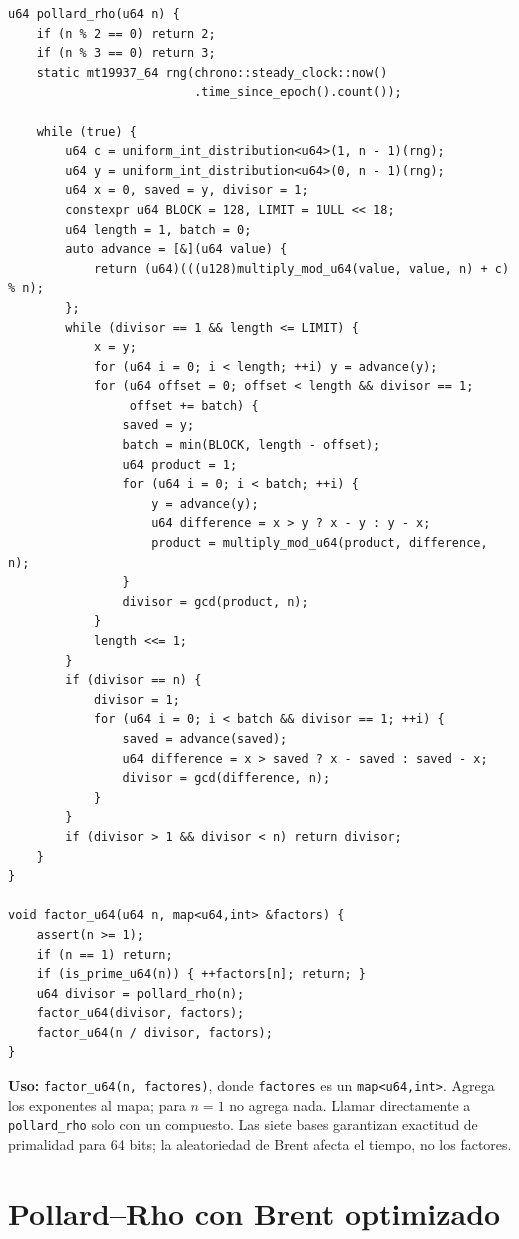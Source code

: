 \begin{lstlisting}[style=cpp]
u64 pollard_rho(u64 n) {
    if (n % 2 == 0) return 2;
    if (n % 3 == 0) return 3;
    static mt19937_64 rng(chrono::steady_clock::now()
                          .time_since_epoch().count());

    while (true) {
        u64 c = uniform_int_distribution<u64>(1, n - 1)(rng);
        u64 y = uniform_int_distribution<u64>(0, n - 1)(rng);
        u64 x = 0, saved = y, divisor = 1;
        constexpr u64 BLOCK = 128, LIMIT = 1ULL << 18;
        u64 length = 1, batch = 0;
        auto advance = [&](u64 value) {
            return (u64)(((u128)multiply_mod_u64(value, value, n) + c) % n);
        };
        while (divisor == 1 && length <= LIMIT) {
            x = y;
            for (u64 i = 0; i < length; ++i) y = advance(y);
            for (u64 offset = 0; offset < length && divisor == 1;
                 offset += batch) {
                saved = y;
                batch = min(BLOCK, length - offset);
                u64 product = 1;
                for (u64 i = 0; i < batch; ++i) {
                    y = advance(y);
                    u64 difference = x > y ? x - y : y - x;
                    product = multiply_mod_u64(product, difference, n);
                }
                divisor = gcd(product, n);
            }
            length <<= 1;
        }
        if (divisor == n) {
            divisor = 1;
            for (u64 i = 0; i < batch && divisor == 1; ++i) {
                saved = advance(saved);
                u64 difference = x > saved ? x - saved : saved - x;
                divisor = gcd(difference, n);
            }
        }
        if (divisor > 1 && divisor < n) return divisor;
    }
}

void factor_u64(u64 n, map<u64,int> &factors) {
    assert(n >= 1);
    if (n == 1) return;
    if (is_prime_u64(n)) { ++factors[n]; return; }
    u64 divisor = pollard_rho(n);
    factor_u64(divisor, factors);
    factor_u64(n / divisor, factors);
}
\end{lstlisting}

\textbf{Uso:} \texttt{factor\_u64(n, factores)}, donde
\texttt{factores} es un \texttt{map<u64,int>}. Agrega los exponentes al mapa;
para $n=1$ no agrega nada. Llamar directamente a \texttt{pollard\_rho}
solo con un compuesto. Las siete bases garantizan exactitud de primalidad
para 64 bits; la aleatoriedad de Brent afecta el tiempo, no los factores.

\section{Pollard--Rho con Brent optimizado}

